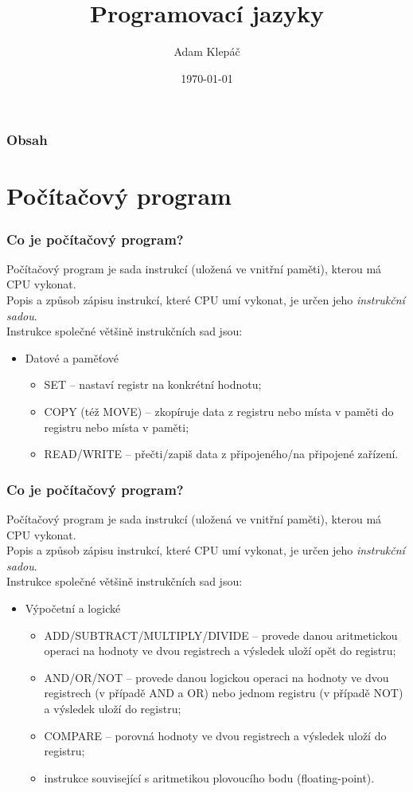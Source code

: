 \documentclass[aspectratio=169,11pt,svgnames]{beamer}
\title{Programovací jazyky}
\date{\today}
\author{Adam Klepáč}
\institute[GEVO]{Gymnázium Evolution Jižní Město}
\begin{document}
\titleframe

\begin{frame}
 \frametitle{Obsah}
 \tableofcontents
\end{frame}

\section{Počítačový program}

\begin{frame}
 \frametitle{Co je počítačový program?}
 Počítačový program je sada instrukcí (uložená ve vnitřní paměti), kterou má CPU
 vykonat.\\
 \pause
 Popis a způsob zápisu instrukcí, které CPU umí vykonat, je určen jeho
 \emph{instrukční sadou}.\\
 \pause
 Instrukce společné většině instrukčních sad jsou:
 \begin{itemize}
  \item \alert{Datové a paměťové}
  \begin{itemize}
   \item \alert{SET} -- nastaví registr na konkrétní hodnotu;
   \pause
   \item \alert{COPY} (též \alert{MOVE}) -- zkopíruje data z registru nebo místa
    v paměti do registru nebo místa v paměti;
   \pause
   \item \alert{READ}/\alert{WRITE} -- přečti/zapiš data z připojeného/na
    připojené zařízení.
  \end{itemize}
 \end{itemize}
\end{frame}

\begin{frame}
 \frametitle{Co je počítačový program?}
 Počítačový program je sada instrukcí (uložená ve vnitřní paměti), kterou má CPU
 vykonat.\\
 Popis a způsob zápisu instrukcí, které CPU umí vykonat, je určen jeho
 \emph{instrukční sadou}.\\
 Instrukce společné většině instrukčních sad jsou:
 \begin{itemize}
  \item \alert{Výpočetní a logické}
  \begin{itemize}
   \item \alert{ADD}/\alert{SUBTRACT}/\alert{MULTIPLY}/\alert{DIVIDE} -- provede
    danou aritmetickou operaci na hodnoty ve dvou registrech a výsledek uloží
    opět do registru;
   \pause
   \item \alert{AND}/\alert{OR}/\alert{NOT} -- provede danou logickou operaci na
    hodnoty ve dvou registrech (v případě \alert{AND} a \alert{OR}) nebo jednom
    registru (v případě \alert{NOT}) a výsledek uloží do registru;
   \pause
   \item \alert{COMPARE} -- porovná hodnoty ve dvou registrech a výsledek uloží
    do registru;
   \pause
   \item instrukce související s aritmetikou plovoucího bodu (floating-point).
  \end{itemize}
 \end{itemize}
\end{frame}
\end{document}
